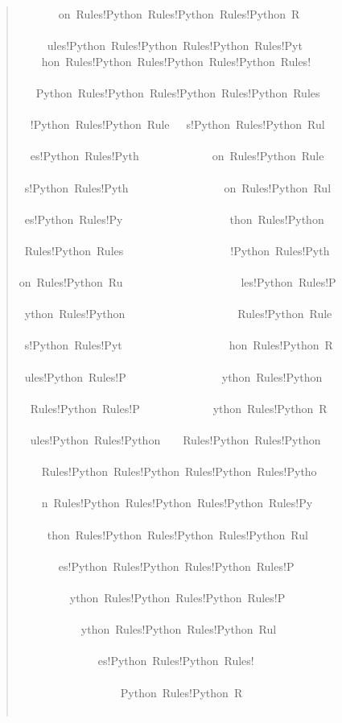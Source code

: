 \documentclass[10pt,english]{article}
\begin{document}
\begin{quote}
\begin{ttfamily}
\begin{flushleft}
\mbox{~~~~~~~on~Rules!Python~Rules!Python~Rules!Python~R~~~~~~~~~~~~~~~~~~}\\
\mbox{~~~~~ules!Python~Rules!Python~Rules!Python~Rules!Pyt~~~~~~~~~~~~~~~~}\\
\mbox{~~~~hon~Rules!Python~Rules!Python~Rules!Python~Rules!~~~~~~~~~~~~~~~}\\
\mbox{~~~Python~Rules!Python~Rules!Python~Rules!Python~Rules~~~~~~~~~~~~~~}\\
\mbox{~~!Python~Rules!Python~Rule~~~s!Python~Rules!Python~Rul~~~~~~~~~~~~~}\\
\mbox{~~es!Python~Rules!Pyth~~~~~~~~~~~~~on~Rules!Python~Rule~~~~~~~~~~~~~}\\
\mbox{~s!Python~Rules!Pyth~~~~~~~~~~~~~~~~~on~Rules!Python~Rul~~~~~~~~~~~~}\\
\mbox{~es!Python~Rules!Py~~~~~~~~~~~~~~~~~~~thon~Rules!Python~~~~~~~~~~~~~}\\
\mbox{~Rules!Python~Rules~~~~~~~~~~~~~~~~~~~!Python~Rules!Pyth~~~~~~~~~~~~}\\
\mbox{on~Rules!Python~Ru~~~~~~~~~~~~~~~~~~~~~les!Python~Rules!P~~~~~~~~~~~}\\
\mbox{~ython~Rules!Python~~~~~~~~~~~~~~~~~~~~Rules!Python~Rule~~~~~~~~~~~~}\\
\mbox{~s!Python~Rules!Pyt~~~~~~~~~~~~~~~~~~~hon~Rules!Python~R~~~~~~~~~~~~}\\
\mbox{~ules!Python~Rules!P~~~~~~~~~~~~~~~~~ython~Rules!Python~~~~~~~~~~~~~}\\
\mbox{~~Rules!Python~Rules!P~~~~~~~~~~~~~ython~Rules!Python~R~~~~~~~~~~~~~}\\
\mbox{~~ules!Python~Rules!Python~~~~Rules!Python~Rules!Python~~~~~~~~~~~~~}\\
\mbox{~~~~Rules!Python~Rules!Python~Rules!Python~Rules!Pytho~~~~~~~~~~~~~~}\\
\mbox{~~~~n~Rules!Python~Rules!Python~Rules!Python~Rules!Py~~~~~~~~~~~~~~~}\\
\mbox{~~~~~thon~Rules!Python~Rules!Python~Rules!Python~Rul~~~~~~~~~~~~~~~~}\\
\mbox{~~~~~~~es!Python~Rules!Python~Rules!Python~Rules!P~~~~~~~~~~~~~~~~~~}\\
\mbox{~~~~~~~~~ython~Rules!Python~Rules!Python~Rules!P~~~~~~~~~~~~~~~~~~~~}\\
\mbox{~~~~~~~~~~~ython~Rules!Python~Rules!Python~Rul~~~~~~~~~~~~~~~~~~~~~~}\\
\mbox{~~~~~~~~~~~~~~es!Python~Rules!Python~Rules!~~~~~~~~~~~~~~~~~~~~~~~~~}\\
\mbox{~~~~~~~~~~~~~~~~~~Python~Rules!Python~R~~~~~~~~~~~~~~~~~~~~~~~~~~~~~}\\

\end{flushleft}
\end{ttfamily}
\end{quote}
\end{document}
